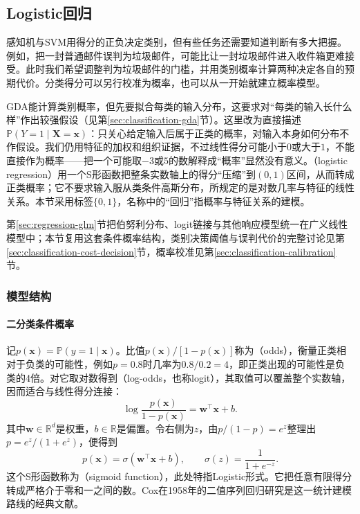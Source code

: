 \subsection{Logistic回归}
\label{sec:classification-logistic}

感知机与SVM用得分的正负决定类别，但有些任务还需要知道判断有多大把握。例如，把一封普通邮件误判为垃圾邮件，可能比让一封垃圾邮件进入收件箱更难接受。此时我们希望调整判为垃圾邮件的门槛，并用类别概率计算两种决定各自的预期代价。分类得分可以另行校准为概率，也可以从一开始就建立概率模型。

GDA能计算类别概率，但先要拟合每类的输入分布，这要求对“每类的输入长什么样”作出较强假设（见第\ref{sec:classification-gda}节）。这里改为直接描述$\mathbb P(Y=1\mid\bm X=\bm x)$：只关心给定输入后属于正类的概率，对输入本身如何分布不作假设。我们仍用特征的加权和组织证据，不过线性得分可能小于$0$或大于$1$，不能直接作为概率——把一个可能取$-3$或$5$的数解释成“概率”显然没有意义。（logistic regression）用一个S形函数把整条实数轴上的得分“压缩”到$(0,1)$区间，从而转成正类概率；它不要求输入服从类条件高斯分布，所规定的是对数几率与特征的线性关系。本节采用标签$\{0,1\}$，名称中的“回归”指概率与特征关系的建模。

第\ref{sec:regression-glm}节把伯努利分布、logit链接与其他响应模型统一在广义线性模型中；本节复用这套条件概率结构，类别决策阈值与误判代价的完整讨论见第\ref{sec:classification-cost-decision}节，概率校准见第\ref{sec:classification-calibration}节。

\subsubsection{模型结构}
\label{sec:classification-logistic-structure}

\paragraph{二分类条件概率}
记$p(\bm{x})=\mathbb{P}(y=1\mid\bm{x})$。比值$p(\bm{x})/[1-p(\bm{x})]$称为（odds），衡量正类相对于负类的可能性，例如$p=0.8$时几率为$0.8/0.2=4$，即正类出现的可能性是负类的4倍。对它取对数得到（log-odds，也称logit），其取值可以覆盖整个实数轴，因而适合与线性得分连接：
\begin{equation}
  \label{eq:classification-logistic-logodds}
  \log\frac{p(\bm{x})}{1-p(\bm{x})}
  =\bm{w}^{\top}\bm{x}+b.
\end{equation}
其中$\bm{w}\in\mathbb{R}^{d}$是权重，$b\in\mathbb{R}$是偏置。令右侧为$z$，由$p/(1-p)=e^z$整理出$p=e^z/(1+e^z)$，便得到
\begin{equation}
  \label{eq:classification-logistic-sigmoid}
  p(\bm{x})=\sigma(\bm{w}^{\top}\bm{x}+b),
  \qquad
  \sigma(z)=\frac{1}{1+e^{-z}}.
\end{equation}
这个S形函数称为（sigmoid function），此处特指Logistic形式。它把任意有限得分转成严格介于零和一之间的数。Cox在1958年的二值序列回归研究是这一统计建模路线的经典文献。

